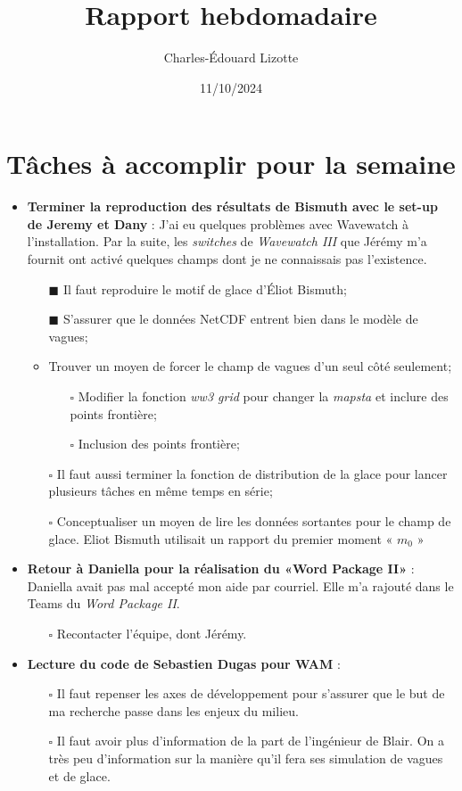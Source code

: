 \documentclass[10pt]{article}
\author{Charles-Édouard Lizotte}
\date{11/10/2024}
\title{Rapport hebdomadaire}
\numberwithin{equation}{section}
\renewcommand{\boxtimes}{\blacksquare}
\begin{document}
\section{Tâches à accomplir pour la semaine}
\label{sec:org3ede40e}

\begin{itemize}
\item\relax [2/4] \textbf{Terminer la reproduction des résultats de Bismuth avec le set-up de Jeremy et Dany} : J'ai eu quelques problèmes avec Wavewatch à l'installation. Par la suite, les \emph{switches} de \emph{Wavewatch III} que Jérémy m'a fournit ont activé quelques champs dont je ne connaissais pas l'existence.
\begin{itemize}
\item[{$\boxtimes$}] Il faut reproduire le motif de glace d'Éliot Bismuth;
\item[{$\boxtimes$}] S'assurer que le données NetCDF entrent bien dans le modèle de vagues;
\item\relax [0/1] Trouver un moyen de forcer le champ de vagues d'un seul côté seulement;
\begin{itemize}
\item[{$\square$}] Modifier la fonction \emph{ww3 grid} pour changer la \emph{mapsta} et inclure des points frontière;
\item[{$\square$}] Inclusion des points frontière;
\end{itemize}
\item[{$\square$}] Il faut aussi terminer la fonction de distribution de la glace pour lancer plusieurs tâches en même temps en série;
\item[{$\square$}] Conceptualiser un moyen de lire les données sortantes pour le champ de glace. Eliot Bismuth utilisait un rapport du premier moment « \(m_0\) »
\end{itemize}

\item\relax [0/1] \textbf{Retour à Daniella pour la réalisation du «Word Package II»} : Daniella avait pas mal accepté mon aide par courriel. Elle m'a rajouté dans le Teams du \emph{Word Package II}.
\begin{itemize}
\item[{$\square$}] Recontacter l'équipe, dont Jérémy.
\end{itemize}

\item\relax [0/2] \textbf{Lecture du code de Sebastien Dugas pour WAM} :
\begin{itemize}
\item[{$\square$}] Il faut repenser les axes de développement pour s'assurer que le but de ma recherche passe dans les enjeux du milieu.
\item[{$\square$}] Il faut avoir plus d'information de la part de l'ingénieur de Blair. On a très peu d'information sur la manière qu'il fera ses simulation de vagues et de glace.
\end{itemize}
\end{itemize}
\end{document}
